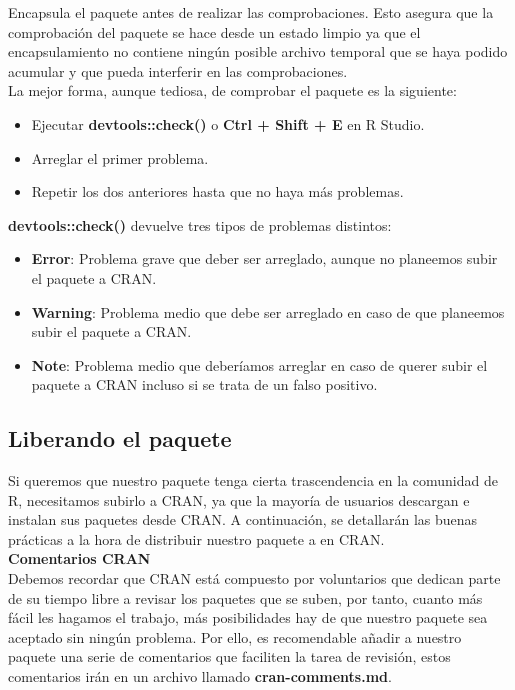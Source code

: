 Encapsula el paquete antes de realizar las comprobaciones. Esto asegura que la
comprobaci\'on del paquete se hace desde un estado limpio ya que el encapsulamiento no
contiene ning\'un posible archivo temporal que se haya podido acumular y que pueda interferir
en las comprobaciones.\\

La mejor forma, aunque tediosa, de comprobar el paquete es la siguiente:

\begin{itemize}
    \item Ejecutar \textbf{devtools::check()} o \textbf{Ctrl + Shift + E} en R Studio.
    \item Arreglar el primer problema.
    \item Repetir los dos anteriores hasta que no haya m\'as problemas.
\end{itemize}

\textbf{devtools::check()} devuelve tres tipos de problemas distintos:

\begin{itemize}
    \item \textbf{Error}: Problema grave que deber ser arreglado, aunque no planeemos subir el paquete a CRAN.
    \item \textbf{Warning}: Problema medio que debe ser arreglado en caso de que planeemos subir el paquete a CRAN.
    \item \textbf{Note}: Problema medio que deber\'iamos arreglar en caso de querer subir el paquete a CRAN incluso si se trata de un falso positivo.
\end{itemize}


\subsection{Liberando el paquete}

Si queremos que nuestro paquete tenga cierta trascendencia en la comunidad de R,
necesitamos subirlo a CRAN, ya que la mayor\'ia de usuarios descargan e instalan sus
paquetes desde CRAN.
A continuaci\'on, se detallar\'an las buenas pr\'acticas a la hora de distribuir nuestro paquete a en CRAN. \\

\textbf{Comentarios CRAN}\\
Debemos recordar que CRAN est\'a compuesto por voluntarios que dedican parte de su tiempo
libre a revisar los paquetes que se suben, por tanto, cuanto m\'as f\'acil les hagamos el trabajo,
m\'as posibilidades hay de que nuestro paquete sea aceptado sin ning\'un problema.
Por ello, es recomendable a\~nadir a nuestro paquete una serie de comentarios que faciliten la
tarea de revisi\'on, estos comentarios ir\'an en un archivo llamado \textbf{cran-comments.md}.

